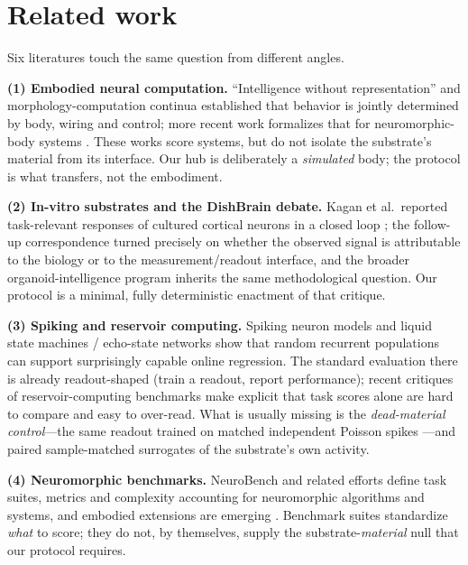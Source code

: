 \documentclass[10pt,a4paper]{article}
\begin{document}
\section{Related work}\label{sec:related}

Six literatures touch the same question from different angles.

\textbf{(1) Embodied neural computation.} ``Intelligence without
representation'' \cite{brooks1991} and morphology-computation continua
\cite{pfeifer2006how} established that behavior is jointly determined
by body, wiring and control; more recent work formalizes that for
neuromorphic-body systems \cite{dangelo2026benchmark,bartolozzi2022embodied}.
These works score systems, but do not isolate the substrate's material
from its interface. Our hub is deliberately a \emph{simulated} body; the
protocol is what transfers, not the embodiment.

\textbf{(2) In-vitro substrates and the DishBrain debate.} Kagan et
al.\ reported task-relevant responses of cultured cortical neurons in a
closed loop \cite{kagan2022dishbrain}; the follow-up correspondence
\cite{balci2023neurons,kagan2023semantics} turned precisely on whether
the observed signal is attributable to the biology or to the
measurement/readout interface, and the broader organoid-intelligence
program \cite{smirnova2023organoid,embodied_neurocomp} inherits the same
methodological question. Our protocol is a minimal, fully deterministic
enactment of that critique.

\textbf{(3) Spiking and reservoir computing.} Spiking neuron models
\cite{maass1997,izhikevich2003,izhikevich2004,gerstner2002} and liquid
state machines / echo-state networks \cite{maass2002liquid,
jaeger2001echo,lukosevicius2009} show that random recurrent populations
can support surprisingly capable online regression. The standard
evaluation there is already readout-shaped (train a readout, report
performance); recent critiques of reservoir-computing benchmarks
\cite{wringe2025rc,yan2024rc} make explicit that task scores alone are
hard to compare and easy to over-read. What is usually missing is the
\emph{dead-material control}---the same readout trained on matched
independent Poisson spikes \cite{lukosevicius2009}---and paired
sample-matched surrogates of the substrate's own activity.

\textbf{(4) Neuromorphic benchmarks.} NeuroBench
\cite{neurobench2025} and related efforts define task suites, metrics
and complexity accounting for neuromorphic algorithms and systems, and
embodied extensions are emerging \cite{dangelo2026benchmark}. Benchmark
suites standardize \emph{what} to score; they do not, by themselves,
supply the substrate-\emph{material} null that our protocol requires.
\end{document}

